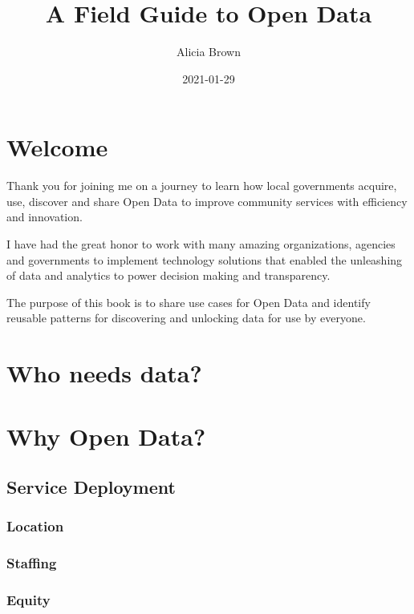 \documentclass[
]{book}
\title{A Field Guide to Open Data}
\author{Alicia Brown}
\date{2021-01-29}
\begin{document}
\maketitle

{
\setcounter{tocdepth}{1}
\tableofcontents
}
\hypertarget{welcome}{%
\chapter{Welcome}\label{welcome}}

Thank you for joining me on a journey to learn how local governments acquire, use, discover and share Open Data to improve community services with efficiency and innovation.

I have had the great honor to work with many amazing organizations, agencies and governments to implement technology solutions that enabled the unleashing of data and analytics to power decision making and transparency.

The purpose of this book is to share use cases for Open Data and identify reusable patterns for discovering and unlocking data for use by everyone.

\hypertarget{who-needs-data}{%
\chapter{Who needs data?}\label{who-needs-data}}

\hypertarget{why-open-data}{%
\chapter{Why Open Data?}\label{why-open-data}}

\hypertarget{service-deployment}{%
\section{Service Deployment}\label{service-deployment}}

\hypertarget{location}{%
\subsection{Location}\label{location}}

\hypertarget{staffing}{%
\subsection{Staffing}\label{staffing}}

\hypertarget{equity}{%
\subsection{Equity}\label{equity}}
\end{document}
